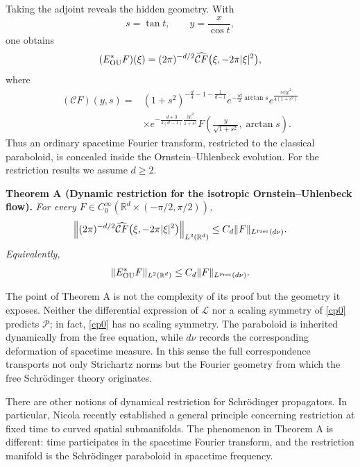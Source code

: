 \documentclass[11pt,a4paper]{amsart}
\def \R {\mathbb{R}}
\numberwithin{equation}{section}
\numberwithin{equation}{section}
\begin{document}
Taking the adjoint reveals the hidden geometry.  With
\[
s=\tan t,\qquad y=\frac{x}{\cos t},
\]
one obtains
\begin{equation}\label{OUadjoint-intro}
(E_{\rm OU}^*F)(\xi)
=
(2\pi)^{-d/2}
\widehat{\mathcal CF}
\big(\xi,-2\pi|\xi|^2\big),
\end{equation}
where
\begin{equation}\label{OUrestrictiontransform-intro}
\begin{aligned}
(\mathcal CF)(y,s)
={}&
(1+s^2)^{-\frac d4-1-\frac1{d-1}}
e^{-\frac{id}{2}\arctan s}
e^{\frac{is|y|^2}{4(1+s^2)}}\\
&\times
e^{-\frac{d+3}{4(d-1)}
       \frac{|y|^2}{1+s^2}}
F\left(
\frac{y}{\sqrt{1+s^2}},
\arctan s
\right).
\end{aligned}
\end{equation}
Thus an ordinary spacetime Fourier transform, restricted to the
classical paraboloid, is concealed inside the Ornstein--Uhlenbeck
evolution.
For the restriction results we assume $d\ge2$.

\medskip
\noindent
\textbf{Theorem A (Dynamic restriction for the isotropic
Ornstein--Uhlenbeck flow).}
\emph{For every
$F\in C^\infty_0(\R^d\times(-\pi/2,\pi/2))$,
\[
\left\|
(2\pi)^{-d/2}
\widehat{\mathcal CF}
\big(\xi,-2\pi|\xi|^2\big)
\right\|_{L^2(\R^d)}
\leq
C_d
\|F\|_{L^{p_{\rm res}}(d\nu)}.
\]
Equivalently,
\[
\|E_{\rm OU}^*F\|_{L^2(\R^d)}
\leq
C_d\|F\|_{L^{p_{\rm res}}(d\nu)}.
\]
}

\medskip

The point of Theorem A is not the complexity of its proof but the
geometry it exposes.  Neither the differential expression of
$\mathscr L$ nor a scaling symmetry of \eqref{cp0} predicts
$\mathcal P$; in fact, \eqref{cp0} has no scaling symmetry.  The
paraboloid is inherited dynamically from the free equation, while
$d\nu$ records the corresponding deformation of spacetime measure.
In this sense the full correspondence transports not only
Strichartz norms but the Fourier geometry from which the free
Schr\"odinger theory originates.

There are other notions of dynamical restriction for Schr\"odinger
propagators.  In particular, Nicola \cite{NicolaRestriction}
recently established a general principle concerning restriction at
fixed time to curved spatial submanifolds.  The phenomenon in
Theorem A is different: time participates in the spacetime Fourier
transform, and the restriction manifold is the Schr\"odinger
paraboloid in spacetime frequency.
\end{document}
